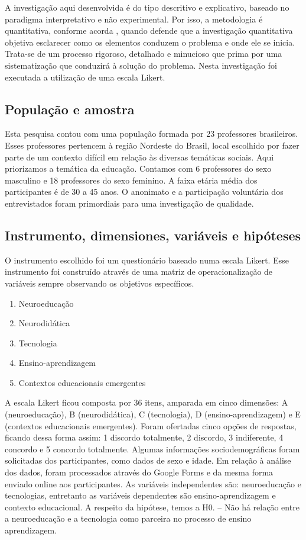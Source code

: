 \documentclass[portuguese]{textolivre}
\begin{document}
A investigação aqui desenvolvida é do tipo descritivo e explicativo, baseado no paradigma interpretativo e não experimental. Por isso, a metodologia é quantitativa, conforme acorda \textcite{hurtado_leon_paradigmas_1998}, quando defende que a investigação quantitativa objetiva esclarecer como os elementos conduzem o problema e onde ele se inicia. Trata-se de um processo rigoroso, detalhado e minucioso que prima por uma sistematização que conduzirá à solução do problema. Nesta investigação foi executada a utilização de uma escala Likert.

\subsection{População e amostra}\label{sec-organizacao-latex}
Esta pesquisa contou com uma população formada por 23 professores brasileiros. Esses professores pertencem à região Nordeste do Brasil, local escolhido por fazer parte de um contexto difícil em relação às diversas temáticas sociais. Aqui priorizamos a temática da educação. Contamos com 6 professores do sexo masculino e 18 professores do sexo feminino. A faixa etária média dos participantes é de 30 a 45 anos. O anonimato e a participação voluntária dos entrevistados foram primordiais para uma investigação de qualidade.

\subsection{Instrumento, dimensiones, variáveis e hipóteses}\label{sec-idioma}
O instrumento escolhido foi um questionário baseado numa escala Likert. Esse instrumento foi construído através de uma matriz de operacionalização de variáveis sempre observando os objetivos específicos. 

\begin{enumerate}[label=\Alph*.]
    \item Neuroeducação
    \item Neurodidática
    \item Tecnologia
    \item Ensino-aprendizagem
    \item Contextos educacionais emergentes
\end{enumerate}

A escala Likert ficou composta por 36 itens, amparada em cinco dimensões: A (neuroeducação), B (neurodidática), C (tecnologia), D (ensino-aprendizagem) e E (contextos educacionais emergentes). Foram ofertadas cinco opções de respostas, ficando dessa forma assim: 1 discordo totalmente, 2 discordo, 3 indiferente, 4 concordo e 5 concordo totalmente. Algumas informações sociodemográficas foram solicitadas dos participantes, como dados de sexo e idade. Em relação à análise dos dados, foram processados através do Google Forms e da mesma forma enviado online aos participantes. As variáveis independentes são: neuroeducação e tecnologias, entretanto as variáveis dependentes são ensino-aprendizagem e contexto educacional. 
A respeito da hipótese, temos a H0. – Não há relação entre a neuroeducação e a tecnologia como parceira no processo de ensino aprendizagem.
\end{document}
